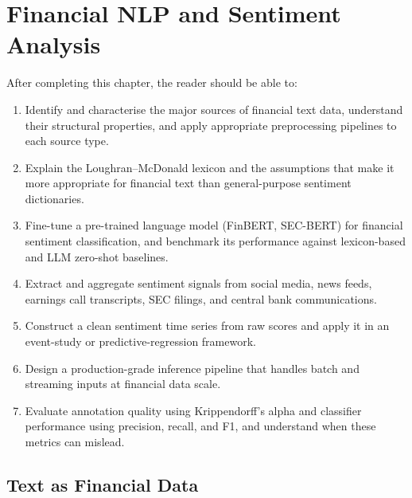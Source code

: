 \chapter{Financial NLP and Sentiment Analysis}
\label{ch:financial-nlp-sentiment}

\begin{remark}
After completing this chapter, the reader should be able to:
\begin{enumerate}
  \item Identify and characterise the major sources of financial text data, understand
        their structural properties, and apply appropriate preprocessing pipelines to
        each source type.
  \item Explain the Loughran--McDonald lexicon and the assumptions that make it more
        appropriate for financial text than general-purpose sentiment dictionaries.
  \item Fine-tune a pre-trained language model (FinBERT, SEC-BERT) for financial
        sentiment classification, and benchmark its performance against lexicon-based
        and LLM zero-shot baselines.
  \item Extract and aggregate sentiment signals from social media, news feeds, earnings
        call transcripts, SEC filings, and central bank communications.
  \item Construct a clean sentiment time series from raw scores and apply it in an
        event-study or predictive-regression framework.
  \item Design a production-grade inference pipeline that handles batch and streaming
        inputs at financial data scale.
  \item Evaluate annotation quality using Krippendorff's alpha and classifier performance
        using precision, recall, and F1, and understand when these metrics can mislead.
\end{enumerate}
\end{remark}

\section{Text as Financial Data}
\label{sec:ch09-text-as-financial-data}

